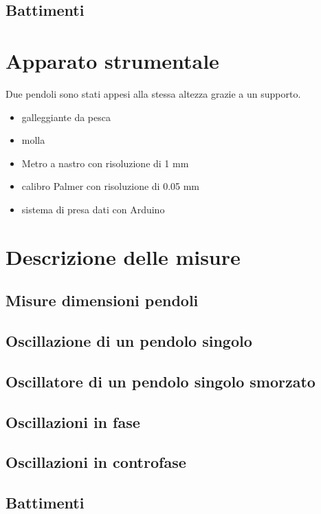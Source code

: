 \documentclass{article}
\begin{document}
		\subsection{  Battimenti}
					    
\section{Apparato strumentale}

Due pendoli sono stati appesi alla stessa altezza grazie a un supporto.

			\begin{itemize}
					   \item galleggiante da pesca 
					   \item molla 
					   \item Metro a nastro con risoluzione di 1 mm 
					   \item calibro Palmer con risoluzione di 0.05 mm
					   \item sistema di presa dati con Arduino
			\end{itemize}

\section{Descrizione delle misure}
	
		\subsection{ Misure dimensioni pendoli }
		\subsection{ Oscillazione di un pendolo singolo}
		\subsection{  Oscillatore di un pendolo singolo smorzato }
		\subsection{  Oscillazioni in fase}
		\subsection{  Oscillazioni in controfase}
		\subsection{  Battimenti}
\end{document}
